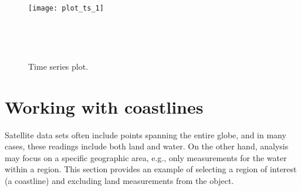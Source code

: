 \documentclass[11pt]{report}
\begin{document}
\begin{figure}[!p]
  \centering
  \begin{minipage}[b]{\linewidth}
    \centering
    \texttt{[image: plot\_ts\_1]}
  \end{minipage}\\
  \begin{minipage}[b]{\linewidth}
    \centering
    
  \end{minipage}\\
  \caption{Time series plot.}
  \label{fig:plot_ts_1}
\end{figure}

\section{Working with coastlines}

Satellite data sets often include points spanning the entire globe, and in many cases, these readings include both land and water.
On the other hand, analysis may focus on a specific geographic area, e.g., only measurements for the water within a region.
This section provides an example of selecting a region of interest (a coastline) and excluding land measurements from the  object.
\end{document}
